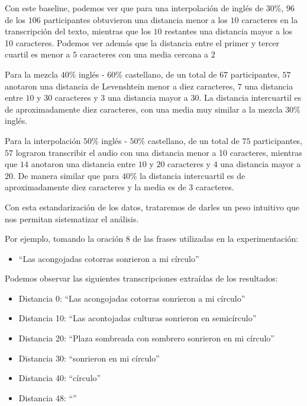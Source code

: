 Con este baseline, podemos ver que para una interpolación de inglés de $30\%$, $96$ de los $106$ participantes obtuvieron una distancia menor a los $10$ caracteres en la transcripción del texto, mientras que los $10$ restantes una distancia mayor a los 10 caracteres. Podemos ver además que la distancia entre el primer y tercer cuartil es menor a $5$ caracteres con una media cercana a $2$ 

Para la mezcla $40\%$ inglés - $60\%$ castellano, de un total de $67$ participantes, $57$ anotaron una distancia de Levenshtein menor a diez caracteres, $7$ una distancia entre $10$ y $30$ caracteres y $3$ una distancia mayor a $30$. La distancia intercuartil es de aproximadamente diez caracteres, con una media muy similar a la mezcla $30\%$ inglés.

Para la interpolación $50\%$ inglés - $50\%$ castellano, de un total de $75$ participantes, $57$ lograron transcribir el audio con una distancia menor a 10 caracteres, mientras que $14$ anotaron una distancia entre $10$ y $20$ caracteres y $4$ una distancia mayor a $20$. De manera similar que para $40\%$ la distancia intercuartil es de aproximadamente diez caracteres y la media es de $3$ caracteres.

Con esta estandarización de los datos, trataremos de darles un peso intuitivo que nos permitan sistematizar el análisis.

Por ejemplo, tomando la oración $8$ de las frases utilizadas en la experimentación: 

\begin{itemize}
	\item ``Las acongojadas cotorras sonrieron a mi círculo''
\end{itemize}

Podemos observar las siguientes transcripciones extraídas de los resultados:

\begin{itemize}
	\item Distancia 0: ``Las acongojadas cotorras sonrieron a mi círculo''
	\item Distancia 10: ``Las acontojadas culturas sonrieron en semicírculo''
	\item Distancia 20: ``Plaza sombreada con sombrero sonrieron en mi círculo''
	\item Distancia 30: ``sonrieron en mi círculo''
	\item Distancia 40: ``círculo''
	\item Distancia 48: ``''
\end{itemize}

